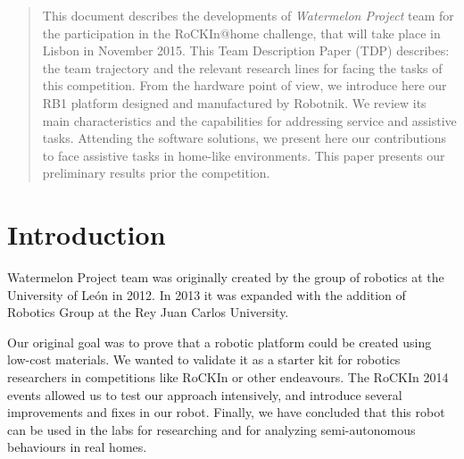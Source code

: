 \documentclass[conference]{IEEEtran}
\begin{document}




\maketitle

\begin{abstract}
This document describes the developments of \textit{Watermelon Project} team for the participation in the RoCKIn@home challenge, that will take place in Lisbon in November 2015. 
This Team Description Paper (TDP) describes: the team trajectory and the relevant research lines for facing the tasks of this competition.
From the hardware point of view, we introduce here our RB1 platform designed and manufactured by Robotnik. We review its main characteristics and the capabilities for addressing service and assistive tasks.
Attending the software solutions, we present here our contributions to face assistive tasks in home-like environments. 
This paper presents our preliminary results prior the competition.
\end{abstract}





%
\IEEEpeerreviewmaketitle



\section{Introduction}

Watermelon Project team was originally created by the group of robotics at the University of
Le\'on in 2012. In 2013 it was expanded with the addition of Robotics Group at the Rey Juan
Carlos University. 

Our original goal was to prove that a robotic platform could be created  using low-cost materials.
We wanted to validate it as a starter kit for robotics researchers in competitions like RoCKIn or other
endeavours. The RoCKIn 2014 events allowed us to test our approach intensively, and introduce
several improvements and fixes in our robot. Finally, we have concluded that 
this robot can be used in the labs for researching and for analyzing semi-autonomous behaviours in 
real homes. 
\end{document}
